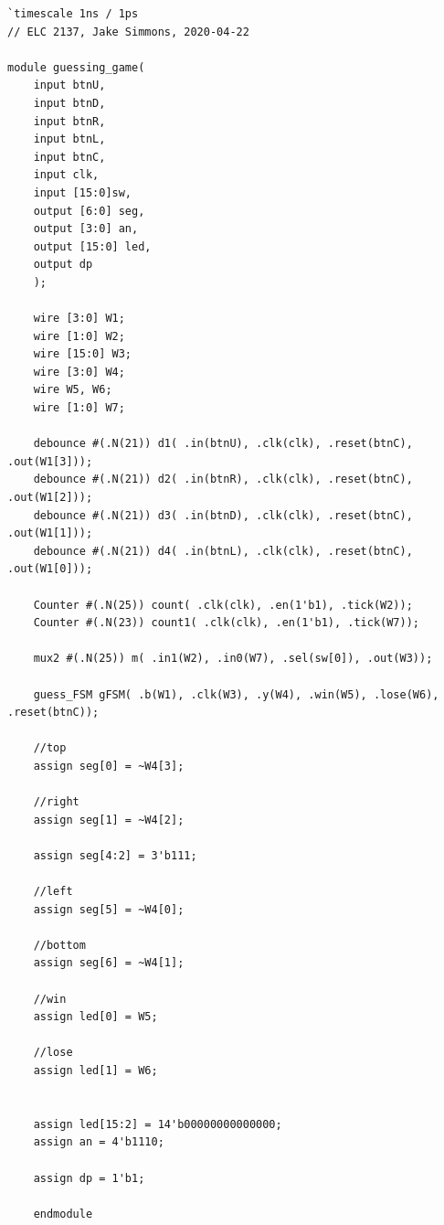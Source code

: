\documentclass[11pt]{article}
\begin{document}
\begin{lstlisting}[style=Verilog,
caption=guessing game Module,
label=game
]
`timescale 1ns / 1ps
// ELC 2137, Jake Simmons, 2020-04-22

module guessing_game(
	input btnU,
	input btnD,
	input btnR,
	input btnL,
	input btnC,
	input clk,
	input [15:0]sw,
	output [6:0] seg,
	output [3:0] an,
	output [15:0] led,
	output dp
	);

	wire [3:0] W1;
	wire [1:0] W2;
	wire [15:0] W3;
	wire [3:0] W4;
	wire W5, W6;
	wire [1:0] W7;

	debounce #(.N(21)) d1( .in(btnU), .clk(clk), .reset(btnC), .out(W1[3]));
	debounce #(.N(21)) d2( .in(btnR), .clk(clk), .reset(btnC), .out(W1[2]));
	debounce #(.N(21)) d3( .in(btnD), .clk(clk), .reset(btnC), .out(W1[1]));
	debounce #(.N(21)) d4( .in(btnL), .clk(clk), .reset(btnC), .out(W1[0]));

	Counter #(.N(25)) count( .clk(clk), .en(1'b1), .tick(W2));
	Counter #(.N(23)) count1( .clk(clk), .en(1'b1), .tick(W7));

	mux2 #(.N(25)) m( .in1(W2), .in0(W7), .sel(sw[0]), .out(W3));

	guess_FSM gFSM( .b(W1), .clk(W3), .y(W4), .win(W5), .lose(W6), .reset(btnC));

	//top
	assign seg[0] = ~W4[3];

	//right
	assign seg[1] = ~W4[2];

	assign seg[4:2] = 3'b111;

	//left
	assign seg[5] = ~W4[0];

	//bottom
	assign seg[6] = ~W4[1];

	//win
	assign led[0] = W5;

	//lose
	assign led[1] = W6;


	assign led[15:2] = 14'b00000000000000;
	assign an = 4'b1110;

	assign dp = 1'b1;

	endmodule



\end{lstlisting}
\end{document}
